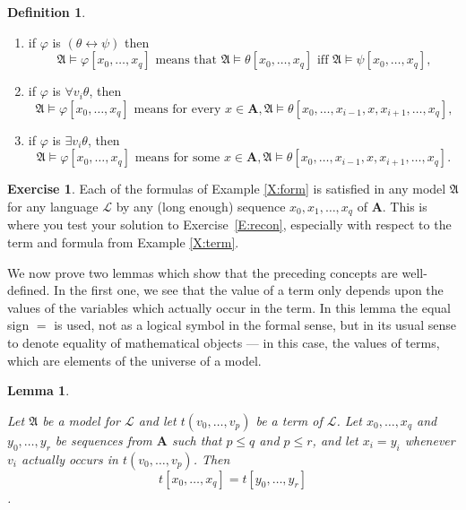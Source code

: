 \documentclass[titlepage, oneside]{amsbook}
\theoremstyle{plain}
\newtheorem{lemma}{Lemma}
\theoremstyle{definition}
\newtheorem{exercise}{Exercise}
\newtheorem{definition}{Definition}
\theoremstyle{remark}
\newcommand{\lan}{\ensuremath{\mathcal{L}}}
\newcommand{\ma}{\ensuremath{\mathfrak{A}}}
\newcommand{\ba}{\ensuremath{\mathbf{A}}}
\newcommand{\vnot}[2][0]{\ensuremath{ v_{#1} , \dots , v_{#2}}}
\begin{document}
\begin{definition}
\begin{enumerate}
\item if $\varphi $ is $( \theta  \leftrightarrow \psi) $ then
\[
\mathfrak{A} \models \varphi [x_{0} ,\dots ,x_{q}] \mbox{ means that  } 
\mathfrak{A} \models \theta [x_{0}, \dots , x_{q}] \mbox{ iff } 
\mathfrak{A} \models \psi [x_{0}, \dots , x_{q}] \mbox{,} \]

\item if $\varphi$ is $\forall v_{i} \theta$, then
\[ \mathfrak{A} \models \varphi [x_{0} , \dots , x_{q}] \mbox{ means for 
every } x \in \mathbf{A}, \mathfrak{A} \models \theta [x_{0}, \dots , 
x_{i-1}, x, x_{i+1} , \dots , x_{q}] \mbox{,} \]



\item if $\varphi$ is $\exists v_{i} \theta$, then
\[ \mathfrak{A} \models \varphi [x_{0} , \dots , x_{q}] \mbox{ means for 
some } x \in \mathbf{A}, \mathfrak{A} \models \theta [x_{0}, \dots , 
x_{i-1}, x, x_{i+1} , \dots , x_{q}]. \]

\end{enumerate}
\end{definition}

\begin{exercise} Each of the formulas of Example \ref{X:form} is
satisfied in any model $\ma$ for any language $\lan$ by any (long
enough) sequence $ x_0 , x_1 , \dots , x_q $
of $\ba$. This is where you test your solution to
Exercise~\ref{E:recon}, especially with respect to the term and formula from Example \ref{X:term}.
\end{exercise}

We now prove two lemmas which show that the preceding concepts are
well-defined. In the first one, we see that the value of a term only 
depends upon the values of the variables which actually occur in the
term.  In this  lemma the equal sign $=$ is used, not as a logical
symbol in the formal sense, but in its usual sense to denote equality
of mathematical objects --- in this case, the values of terms, which
are elements of the universe of a model.

\begin{lemma}\label{L:zippy} 

Let $\mathfrak{A}$ be a model for $\mathcal{L}$ and let 
$t(v_{0}, \dots ,v_{p})$ be a term of $\mathcal{L}$. Let $x_{0} , \dots , 
x_{q}$ and $y_{0} , \dots, y_{r}$ be sequences from $\mathbf{A}$
such that $p \leq q$ and $p \leq r$, and let $x_{i}= y_{i}$ whenever 
$v_{i}$ actually occurs in $t(\vnot{p})$. Then \[ t[x_{0}, \dots ,x_{q}] =
t[y_{0}, 
\dots , y_{r}] \].

\end{lemma}
\end{document}
